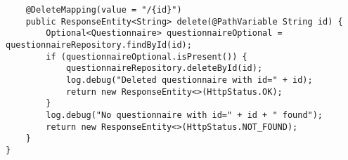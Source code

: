 \begin{verbatim}
    @DeleteMapping(value = "/{id}")
    public ResponseEntity<String> delete(@PathVariable String id) {
        Optional<Questionnaire> questionnaireOptional = questionnaireRepository.findById(id);
        if (questionnaireOptional.isPresent()) {
            questionnaireRepository.deleteById(id);
            log.debug("Deleted questionnaire with id=" + id);
            return new ResponseEntity<>(HttpStatus.OK);
        }
        log.debug("No questionnaire with id=" + id + " found");
        return new ResponseEntity<>(HttpStatus.NOT_FOUND);
    }
}	
\end{verbatim}

